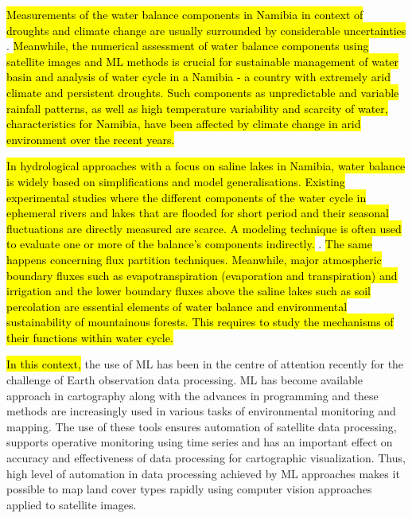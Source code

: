 \documentclass[climate,article,submit,pdftex,moreauthors]{Definitions/mdpi}
\begin{document}
\hl{Measurements of the water balance components in Namibia in context of droughts and climate change are usually surrounded by considerable uncertainties} \cite{Verlinden}. \hl{Meanwhile, the numerical assessment of water balance components using satellite images and ML methods is crucial for sustainable management of water basin and analysis of water cycle in a Namibia - a country with extremely arid climate and persistent droughts. Such components as unpredictable and variable rainfall patterns, as well as high temperature variability and scarcity of water, characteristics for Namibia, have been affected by climate change in arid environment over the recent years.}

\hl{In hydrological approaches with a focus on saline lakes in Namibia, water balance is widely based on simplifications and model generalisations. Existing experimental studies where the different components of the water cycle in ephemeral rivers and lakes that are flooded for short period and their seasonal fluctuations are directly measured are scarce. A modeling technique is often used to evaluate one or more of the balance's components indirectly.} \cite{Dansie}. \hl{The same happens concerning flux partition techniques. Meanwhile, major atmospheric boundary fluxes such as evapotranspiration (evaporation and transpiration) and irrigation and the lower boundary fluxes above the saline lakes such as soil percolation are essential elements of water balance and environmental sustainability of mountainous forests. This requires to study the mechanisms of their functions within water cycle.}

\hl{In this context, }the use of ML has been in the centre of attention recently for the challenge of Earth observation data processing. ML has become available approach in cartography along with the advances in programming and these methods are increasingly used in various tasks of environmental monitoring and mapping. The use of these tools ensures automation of satellite data processing, supports operative monitoring using time series and has an important effect on accuracy and effectiveness of data processing for cartographic visualization. Thus, high level of automation in data processing achieved by ML approaches makes it possible to map land cover types rapidly using computer vision approaches applied to satellite images.
\end{document}
